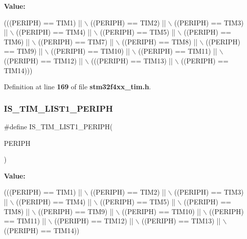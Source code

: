 {\bfseries Value\+:}
\begin{DoxyCode}
(((PERIPH) == TIM1) || \(\backslash\)
                                   ((PERIPH) == TIM2) || \(\backslash\)
                                   ((PERIPH) == TIM3) || \(\backslash\)
                                   ((PERIPH) == TIM4) || \(\backslash\)
                                   ((PERIPH) == TIM5) || \(\backslash\)
                                   ((PERIPH) == TIM6) || \(\backslash\)
                                   ((PERIPH) == TIM7) || \(\backslash\)
                                   ((PERIPH) == TIM8) || \(\backslash\)
                                   ((PERIPH) == TIM9) || \(\backslash\)
                                   ((PERIPH) == TIM10) || \(\backslash\)
                                   ((PERIPH) == TIM11) || \(\backslash\)
                                   ((PERIPH) == TIM12) || \(\backslash\)
                                   (((PERIPH) == TIM13) || \(\backslash\)
                                   ((PERIPH) == TIM14)))
\end{DoxyCode}


Definition at line \textbf{ 169} of file \textbf{ stm32f4xx\+\_\+tim.\+h}.

\mbox{\label{group__TIM__Exported__constants_ga1abea04e3837b7683d8e8dc33441677f}} 
\subsubsection{I\+S\+\_\+\+T\+I\+M\+\_\+\+L\+I\+S\+T1\+\_\+\+P\+E\+R\+I\+PH}
{\footnotesize\ttfamily \#define I\+S\+\_\+\+T\+I\+M\+\_\+\+L\+I\+S\+T1\+\_\+\+P\+E\+R\+I\+PH(\begin{DoxyParamCaption}\item[{}]{P\+E\+R\+I\+PH }\end{DoxyParamCaption})}

{\bfseries Value\+:}
\begin{DoxyCode}
(((PERIPH) == TIM1) || \(\backslash\)
                                     ((PERIPH) == TIM2) || \(\backslash\)
                                     ((PERIPH) == TIM3) || \(\backslash\)
                                     ((PERIPH) == TIM4) || \(\backslash\)
                                     ((PERIPH) == TIM5) || \(\backslash\)
                                     ((PERIPH) == TIM8) || \(\backslash\)
                                     ((PERIPH) == TIM9) || \(\backslash\)
                                     ((PERIPH) == TIM10) || \(\backslash\)
                                     ((PERIPH) == TIM11) || \(\backslash\)
                                     ((PERIPH) == TIM12) || \(\backslash\)
                                     ((PERIPH) == TIM13) || \(\backslash\)
                                     ((PERIPH) == TIM14))
\end{DoxyCode}



